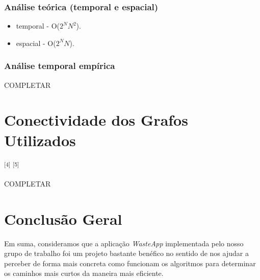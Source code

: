 \documentclass[article, a4paper, 12pt, oneside]{memoir}
\begin{document}
\subsection{Análise teórica (temporal e espacial)}

\begin{itemize}
	\item temporal -  O($2^N N^2$).
	\item espacial - O($2^N N$).
\end{itemize}

\subsection{Análise temporal empírica }

{\Large COMPLETAR}
		
		
\newpage
\chapter[Conectividade dos Grafos Utilizados][Conectividade dos Grafos Utilizados]{Conectividade dos Grafos Utilizados} \label{\thechapter}

\textsuperscript{[4]} \textsuperscript{[5]}

{\Large COMPLETAR}





\newpage
\chapter[Conclusão Geral][Conclusão Geral]{Conclusão Geral} \label{\thechapter}

Em suma, consideramos que a aplicação \textit{WasteApp} implementada pelo nosso grupo de trabalho foi um projeto bastante benéfico no sentido de nos ajudar a perceber de forma mais concreta como funcionam os algoritmos para determinar os caminhos mais curtos da maneira mais eficiente.

\newpage
\end{document}
